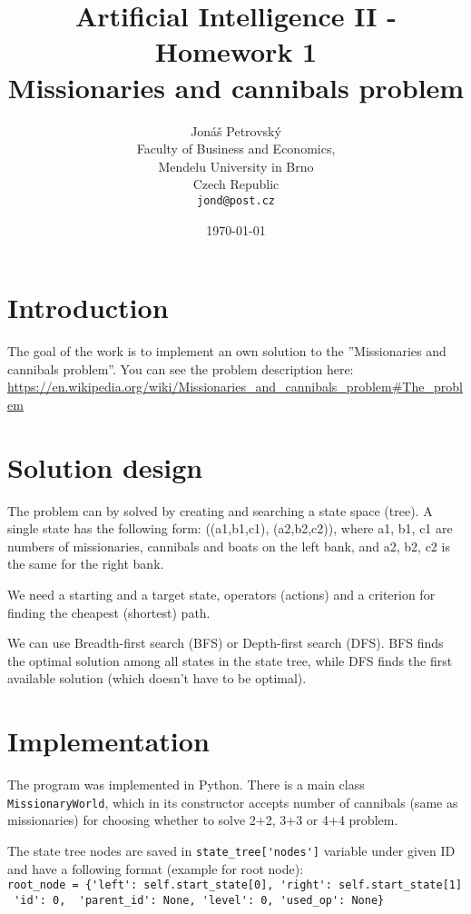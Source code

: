 \documentclass{article}
\begin{document}
\title{Artificial Intelligence II - Homework 1 \\ Missionaries and cannibals problem}
\author{Jonáš Petrovský\\
        Faculty of Business and Economics,\\
		Mendelu University in Brno\\
		Czech Republic \\
		\texttt{jond@post.cz}}  %
\date{\today}  %
\maketitle

\section{Introduction}
The goal of the work is to implement an own solution to the ''Missionaries and cannibals problem''. You can see the problem description here: \url{https://en.wikipedia.org/wiki/Missionaries_and_cannibals_problem#The_problem}

\section{Solution design}
The problem can by solved by creating and searching a state space (tree). A single state has the following form:
((a1,b1,c1), (a2,b2,c2)), where a1, b1, c1 are numbers of missionaries, cannibals and boats on the left bank, and a2, b2, c2 is the same for the right bank.    

We need a starting and a target state, operators (actions) and a criterion for finding the cheapest (shortest) path.

We can use Breadth-first search (BFS) or Depth-first search (DFS). BFS finds the optimal solution among all states in the state tree, while DFS finds the first available solution (which doesn't have to be optimal).  

\section{Implementation}
The program was implemented in Python. There is a main class \texttt{MissionaryWorld}, which in its constructor accepts number of cannibals (same as missionaries) for choosing whether to solve 2+2, 3+3 or 4+4 problem. 

The state tree nodes are saved in \verb|state_tree['nodes']| variable under given ID and have a following format (example for root node): \\
\verb|root_node = {'left': self.start_state[0], 'right': self.start_state[1]| \\
\verb| 'id': 0,  'parent_id': None, 'level': 0, 'used_op': None}|
\end{document}
